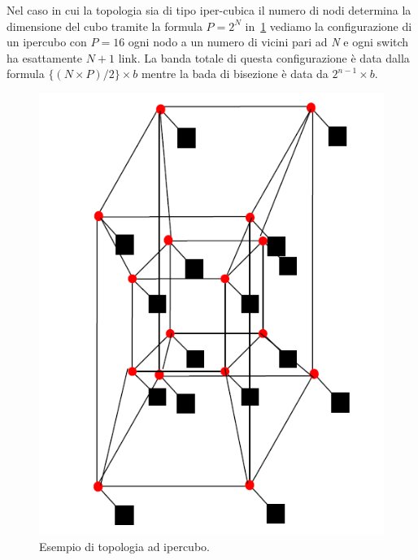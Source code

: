 Nel caso in cui la topologia sia di tipo iper-cubica il numero di nodi determina la dimensione del cubo tramite la formula $P = 2^N$ in \figurename\,\ref{fig:hypercube} vediamo la configurazione di un ipercubo con $P=16$ ogni nodo a un numero di vicini pari ad \emph{N} e ogni switch ha esattamente $N+1$ link. La banda totale di questa configurazione è data dalla formula $\{(N \times P)/2\}\times b$ mentre la bada di bisezione è data da $2^{n-1} \times b$.
\begin{figure}[htb]
\centering
\includegraphics[scale=0.5]{img/hypercube.png}
\caption{Esempio di topologia ad ipercubo.}\label{fig:hypercube}
\end{figure}
